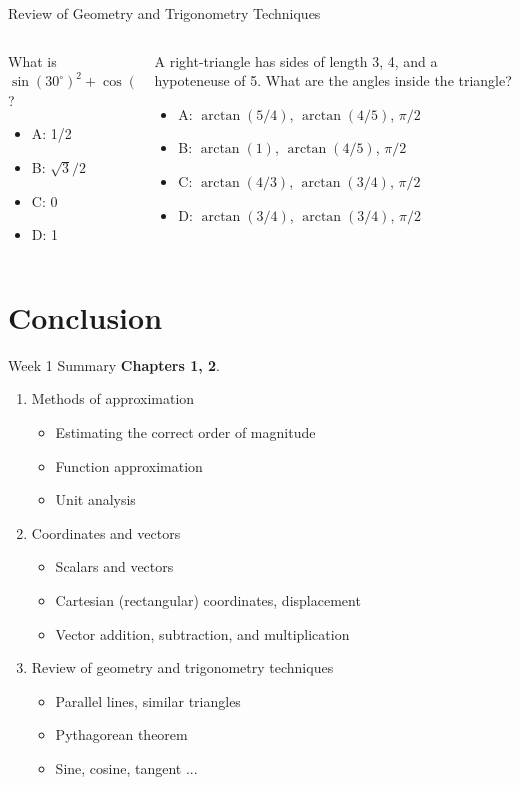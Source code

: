\documentclass{beamer}
\begin{document}
\begin{frame}{Review of Geometry and Trigonometry Techniques}
\small
\begin{columns}[T]
\begin{column}{0.4\textwidth}
What is $\sin(30^{\circ})^2+\cos(30^{\circ})^2$?
\begin{itemize}
\item A: 1/2
\item B: $\sqrt{3}/2$
\item C: 0
\item D: 1
\end{itemize}
\end{column}
\begin{column}{0.6\textwidth}
A right-triangle has sides of length 3, 4, and a hypoteneuse of 5.  What are the angles inside the triangle?
\begin{itemize}
\item A: $\arctan(5/4)$, $\arctan(4/5)$, $\pi/2$
\item B: $\arctan(1)$, $\arctan(4/5)$, $\pi/2$
\item C: $\arctan(4/3)$, $\arctan(3/4)$, $\pi/2$
\item D: $\arctan(3/4)$, $\arctan(3/4)$, $\pi/2$
\end{itemize}
\end{column}
\end{columns}
\end{frame}

\section{Conclusion}

\begin{frame}{Week 1 Summary}
\textbf{Chapters 1, 2}.
\begin{enumerate}
\item Methods of approximation
\begin{itemize}
\item \alert{Estimating} the correct order of magnitude
\item \alert{Function} approximation
\item \alert{Unit analysis}
\end{itemize}
\item Coordinates and vectors
\begin{itemize}
\item \alert{Scalars} and \alert{vectors}
\item \alert{Cartesian} (rectangular) coordinates, displacement
\item \alert{Vector} addition, subtraction, and multiplication
\end{itemize}
\item Review of geometry and trigonometry techniques
\begin{itemize}
\item Parallel lines, similar triangles
\item Pythagorean theorem
\item Sine, cosine, tangent ...
\end{itemize}
\end{enumerate}
\end{frame}
\end{document}
